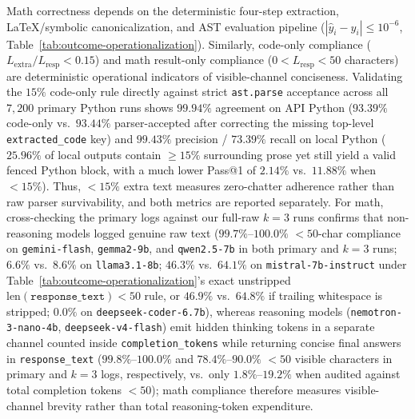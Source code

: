 \documentclass[a4paper,fleqn]{cas-sc}
\begin{document}
Math correctness depends on the deterministic four-step extraction, \LaTeX{}/symbolic canonicalization, and AST evaluation pipeline ($|\hat{y}_i - y_i| \le 10^{-6}$, Table~\ref{tab:outcome-operationalization}). Similarly, code-only compliance ($L_{\text{extra}} / L_{\text{resp}} < 0.15$) and math result-only compliance ($0 < L_{\text{resp}} < 50$ characters) are deterministic operational indicators of visible-channel conciseness. Validating the $15\%$ code-only rule directly against strict \texttt{ast.parse} acceptance across all $7{,}200$ primary Python runs shows $99.94\%$ agreement on API Python ($93.39\%$ code-only vs.\ $93.44\%$ parser-accepted after correcting the missing top-level \texttt{extracted\_code} key) and $99.43\%$ precision / $73.39\%$ recall on local Python ($25.96\%$ of local outputs contain $\ge 15\%$ surrounding prose yet still yield a valid fenced Python block, with a much lower Pass@1 of $2.14\%$ vs.\ $11.88\%$ when $<15\%$). Thus, $<15\%$ extra text measures zero-chatter adherence rather than raw parser survivability, and both metrics are reported separately. For math, cross-checking the primary logs against our full-raw $k = 3$ runs confirms that non-reasoning models logged genuine raw text ($99.7\%$--$100.0\%$ $<50$-char compliance on \texttt{gemini-flash}, \texttt{gemma2-9b}, and \texttt{qwen2.5-7b} in both primary and $k=3$ runs; $6.6\%$ vs.\ $8.6\%$ on \texttt{llama3.1-8b}; $46.3\%$ vs.\ $64.1\%$ on \texttt{mistral-7b-instruct} under Table~\ref{tab:outcome-operationalization}'s exact unstripped $\text{len}(\texttt{response\_text}) < 50$ rule, or $46.9\%$ vs.\ $64.8\%$ if trailing whitespace is stripped; $0.0\%$ on \texttt{deepseek-coder-6.7b}), whereas reasoning models (\texttt{nemotron-3-nano-4b}, \texttt{deepseek-v4-flash}) emit hidden thinking tokens in a separate channel counted inside \texttt{completion\_tokens} while returning concise final answers in \texttt{response\_text} ($99.8\%$--$100.0\%$ and $78.4\%$--$90.0\%$ $<50$ visible characters in primary and $k=3$ logs, respectively, vs.\ only $1.8\%$--$19.2\%$ when audited against total completion tokens $<50$); math compliance therefore measures visible-channel brevity rather than total reasoning-token expenditure.
\end{document}
